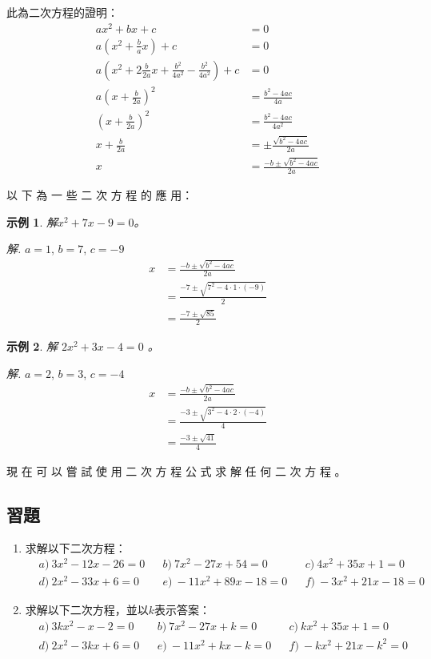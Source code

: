 \documentclass[12pt]{article}
\newtheorem{example}{示例}
\begin{document}
    此為二次方程的證明：\begin{align*}
        ax^2+bx+c&=0\\
        a(x^2+\frac{b}{a}x)+c&=0\\
        a(x^2+2\frac{b}{2a}x+\frac{b^2}{4a^2}-\frac{b^2}{4a^2})+c&=0\\
        a(x+\frac{b}{2a})^2&=\frac{b^2-4ac}{4a}\\
        (x+\frac{b}{2a})^2&=\frac{b^2-4ac}{4a^2}\\
        x+\frac{b}{2a}&=\pm\frac{\sqrt{b^2-4ac}}{2a}\\
        x&=\frac{-b\pm\sqrt{b^2-4ac}}{2a}
    \end{align*}

    以 下 為 一 些 二 次 方 程 的 應 用：

    \begin{example}
        解$x^2+7x-9=0$。
    \end{example}

    \textit{ 解.} $a=1$, $b=7$, $c=-9$ \begin{align*}
        x&=\frac{-b\pm\sqrt{b^2-4ac}}{2a}\\
        &=\frac{-7\pm\sqrt{7^2-4\cdot 1\cdot (-9)}}{2}\\
        &=\frac{-7\pm\sqrt{85}}{2}
    \end{align*}

    \begin{example}
        解 $2x^2+3x-4=0$ 。
    \end{example}

    \textit{ 解.}  $a=2$, $b=3$, $c=-4$ \begin{align*}
        x&=\frac{-b\pm\sqrt{b^2-4ac}}{2a}\\
        &=\frac{-3\pm\sqrt{3^2-4\cdot 2\cdot (-4)}}{4}\\
        &=\frac{-3\pm\sqrt{41}}{4}
    \end{align*}

    現 在 可 以 嘗 試 使 用 二 次 方 程 公 式 求 解 任 何 二 次 方 程 。

    \subsection*{習題}

    \begin{enumerate}
        \item 求解以下二次方程：\begin{align*}
            &a)\ 3x^2-12x-26=0&&b)\ 7x^2-27x+54=0&&c)\ 4x^2+35x+1=0\\
            &d)\ 2x^2-33x+6=0&&e)\ -11x^2+89x-18=0&&f)\ -3x^2+21x-18=0
        \end{align*}
        \item 求解以下二次方程，並以$k$表示答案：\begin{align*}
            &a)\ 3kx^2-x-2=0&&b)\ 7x^2-27x+k=0&&c)\ kx^2+35x+1=0\\
            &d)\ 2x^2-3kx+6=0&&e)\ -11x^2+kx-k=0&&f)\ -kx^2+21x-k^2=0
        \end{align*}
    \end{enumerate}
\end{document}
